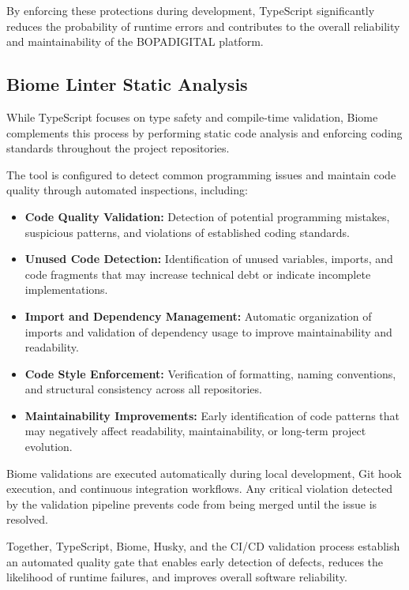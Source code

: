 \documentclass[letterpaper%
, oneside%
, 12pt%
, memoireprojet%
, english%
,creativecommons,hyperref, withAlgo2e %
]{thETS}
\begin{document}
By enforcing these protections during development, TypeScript significantly reduces the probability of runtime errors and contributes to the overall reliability and maintainability of the BOPADIGITAL platform.


\subsection{Biome Linter Static Analysis}

While TypeScript focuses on type safety and compile-time validation, Biome complements this process by performing static code analysis and enforcing coding standards throughout the project repositories.

The tool is configured to detect common programming issues and maintain code quality through automated inspections, including:

\begin{itemize}

\item \textbf{Code Quality Validation:} Detection of potential programming mistakes, suspicious patterns, and violations of established coding standards.

\item \textbf{Unused Code Detection:} Identification of unused variables, imports, and code fragments that may increase technical debt or indicate incomplete implementations.

\item \textbf{Import and Dependency Management:} Automatic organization of imports and validation of dependency usage to improve maintainability and readability.

\item \textbf{Code Style Enforcement:} Verification of formatting, naming conventions, and structural consistency across all repositories.

\item \textbf{Maintainability Improvements:} Early identification of code patterns that may negatively affect readability, maintainability, or long-term project evolution.

\end{itemize}

Biome validations are executed automatically during local development, Git hook execution, and continuous integration workflows. Any critical violation detected by the validation pipeline prevents code from being merged until the issue is resolved.

Together, TypeScript, Biome, Husky, and the CI/CD validation process establish an automated quality gate that enables early detection of defects, reduces the likelihood of runtime failures, and improves overall software reliability.
\end{document}

